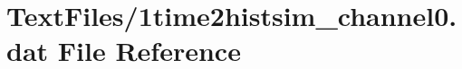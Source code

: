\hypertarget{1time2histsim__channel0_8dat}{}\section{Text\+Files/1time2histsim\+\_\+channel0.dat File Reference}
\label{1time2histsim__channel0_8dat}
